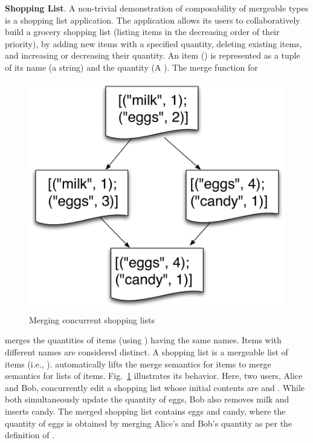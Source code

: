 

{\bf Shopping List}. A non-trivial demonstration of composability of
mergeable types is a shopping list application. The application allows
its users to collaboratively build a grocery shopping list (listing
items in the decreasing order of their priority), by adding new items
with a specified quantity, deleting existing items, and increasing or
decreasing their quantity. An item () is represented as a
tuple of its name (a string) and the quantity (A ). The merge
function for
\begin{figure}
  \centering
  \includegraphics[scale=0.3]{Figures/shopping-list}
  \caption{Merging concurrent shopping lists}
  \label{fig:shopping-list}
\end{figure}
 merges the quantities of items (using ) having
the same names. Items with different names are considered distinct. A
shopping list is a mergeable list of items (i.e.,
).  automatically lifts the merge
semantics for items to merge semantics for lists of items.
Fig.~\ref{fig:shopping-list} illustrates its behavior.  Here, two
users, Alice and Bob, concurrently edit a shopping list whose initial
contents are  and . While both simultaneously update the
quantity of eggs, Bob also removes milk and inserts candy. The merged
shopping list contains eggs and candy, where the quantity of eggs is
obtained by merging Alice's and Bob's quantity as per the definition
of .

